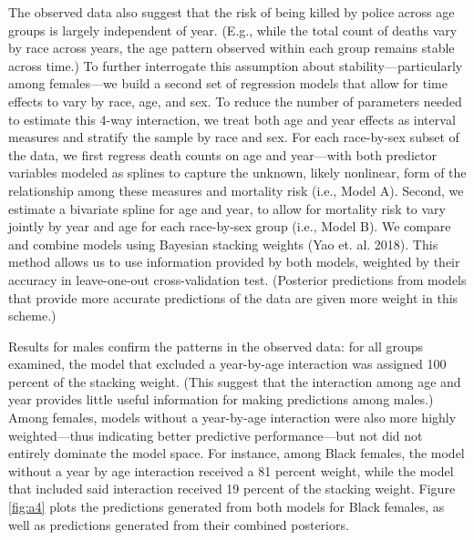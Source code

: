 \documentclass{article}
\begin{document}
The observed data also suggest that the risk of being killed by police across age groups is largely independent of year. (E.g., while the total count of deaths vary by race across years, the age pattern observed within each group remains stable across time.) To further interrogate this assumption about stability---particularly among females---we build a second set of regression models that allow for time effects to vary by race, age, and sex. To reduce the number of parameters needed to estimate this 4-way interaction, we treat both age and year effects as interval measures and stratify the sample by race and sex. For each race-by-sex subset of the data, we first regress death counts on age and year---with both predictor variables modeled as splines to capture the unknown, likely nonlinear, form of the relationship among these measures and mortality risk (i.e., Model A). Second, we estimate a bivariate spline for age and year, to allow for mortality risk to vary jointly by year and age for each race-by-sex group (i.e., Model B). We compare and combine models using Bayesian stacking weights (Yao et. al. 2018). This method allows us to use information provided by both models, weighted by their accuracy in leave-one-out cross-validation test. (Posterior predictions from models that provide more accurate predictions of the data are given more weight in this scheme.) 

Results for males confirm the patterns in the observed data: for all groups examined, the model that excluded a year-by-age interaction was assigned 100 percent of the stacking weight. (This suggest that the interaction among age and year provides little useful information for making predictions among males.) Among females, models without a year-by-age interaction were also more highly weighted---thus indicating better predictive performance---but not did not entirely dominate the model space. For instance, among Black females, the model without a year by age interaction received a 81 percent weight, while the model that included said interaction received 19 percent of the stacking weight. Figure \ref{fig:a4} plots the predictions generated from both models for Black females, as well as predictions generated from their combined posteriors. 
\end{document}
